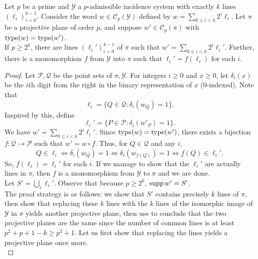 	\begin{flem}
		\label{lemma: big lemma for bagchi}
		Let $p$ be a prime and $\mathcal{Y}$ a $p$-admissible incidence system with exactly $k$ lines $(\ell_i)_{i=0}^{k-1}$. Consider the word $w \in \mathcal{C}_p(\mathcal{Y})$ defined by $w = \sum_{0 \le i < k} 2^i \ell_i$. Let $\pi$ be a projective plane of order $p$, and suppose $w' \in \mathcal{C}_p(\pi)$ with $\operatorname{type}(w) = \operatorname{type}(w')$.\\
		If $p \ge 2^k$, there are lines $(\ell_i')_{i=0}^{k-1}$ of $\pi$ such that $w' = \sum_{0 \le i < k} 2^i \ell_i'$. Further, there is a monomorphism $f$ from $\mathcal{Y}$ into $\pi$ such that $\ell_i' = f(\ell_i)$ for each $i$.
	\end{flem}
	\begin{proof}
		Let $\mathcal{P},\mathcal{Q}$ be the point sets of $\pi,\mathcal{Y}$. For integers $i \ge 0$ and $x \ge 0$, let $\delta_i(x)$ be the $i$th digit from the right in the binary representation of $x$ ($0$-indexed). Note that
		\[ \ell_i = \{ Q \in \mathcal{Q} : \delta_i(w_Q) = 1 \}. \]
		Inspired by this, define
		\[ \ell_i' = \{ P \in \mathcal{P} : \delta_i(w'_P) = 1 \}. \]
		We have $w' = \sum_{0 \le i < k} 2^i \ell_i'$. Since $\operatorname{type}(w) = \operatorname{type}(w')$, there exists a bijection $f : \mathcal{Q} \to \mathcal{P}$ such that $w' = w \circ f$. Thus, for $Q \in \mathcal{Q}$ and any $i$,
		\[ Q \in \ell_i \iff \delta_i(w_Q) = 1 \iff \delta_i(w_{f(Q)}) = 1 \iff f(Q) \in \ell_i'. \]
		So, $f(\ell_i) = \ell_i'$ for each $i$. If we manage to show that the $\ell_i'$ are actually lines in $\pi$, then $f$ is a monomorphism from $\mathcal{Y}$ to $\pi$ and we are done.\\
		Let $S' = \bigcup_{i} \ell_i'$. Observe that because $p \ge 2^k$, $\operatorname{supp} w' = S'$.\\
		The proof strategy is as follows: we show that $S'$ contains precisely $k$ lines of $\pi$, then show that replacing these $k$ lines with the $k$ lines of the isomorphic image of $\mathcal{Y}$ in $\pi$ yields another projective plane, then use  to conclude that the two projective planes are the same since the number of common lines is at least $p^2+p+1-k \ge p^2+1$. Let us first show that replacing the lines yields a projective plane once more.\\


\end{proof}
